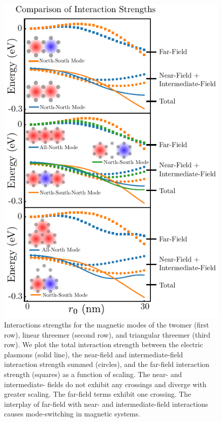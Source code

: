 \documentclass[journal=apchd5,manuscript=article]{achemso}
\begin{document}
\begin{figure}
\centering
\includegraphics{interaction_strength.pdf}
\caption{Interactions strengths for the magnetic modes of the twomer (first row), linear threemer (second row), and triangular threemer (third row). We plot the total interaction strength between the electric plasmons (solid line), the near-field and intermediate-field interaction strength summed (circles), and the far-field interaction strength (squares) as a function of scaling. The near- and intermediate- fields do not exhibit any crossings and diverge with greater scaling. The far-field terms exhibit one crossing. The interplay of far-field with near- and intermediate-field interactions causes mode-switching in magnetic systems.}
\label{interactions}
\end{figure}
\end{document}
